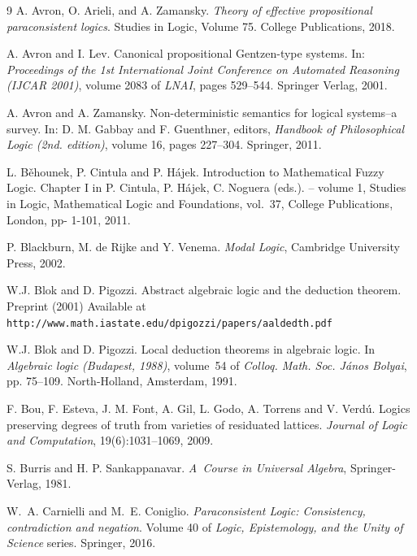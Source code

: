 \documentclass{article}
\theoremstyle{definition}
\begin{document}
\begin{thebibliography}{9}
A. Avron, O. Arieli,  and A. Zamansky. {\em Theory of effective propositional paraconsistent logics}.  Studies in Logic, Volume 75. College Publications, 2018.


A. Avron and I. Lev.
Canonical propositional {G}entzen-type systems.
In: {\em  Proceedings of the 1st {I}nternational {J}oint {C}onference on {A}utomated {R}easoning ({IJCAR} 2001)}, volume 2083 of {\em LNAI}, pages 529--544.
  Springer Verlag, 2001.


A. Avron and A. Zamansky. Non-deterministic semantics for logical
systems--a survey. In: D. M. Gabbay and F. Guenthner, editors, {\em Handbook of Philosophical Logic (2nd. edition)}, volume 16, pages 227--304. Springer, 2011.


  L. B\v{e}hounek, P. Cintula and P. H\'ajek. Introduction to Mathematical Fuzzy Logic. Chapter I in P. Cintula, P. H\'ajek, C. Noguera (eds.).
 -- volume 1,
\newblock Studies in Logic, Mathematical Logic and Foundations, vol.~37, College Publications, London, pp- 1-101, 2011. 


P. Blackburn, M. de Rijke and Y. Venema. {\em Modal Logic}, Cambridge University Press, 2002. 

W.J. Blok and D. Pigozzi. Abstract algebraic logic and the deduction theorem.
Preprint (2001) Available at\\ {\tt\small http://www.math.iastate.edu/dpigozzi/papers/aaldedth.pdf}

W.J. Blok and D. Pigozzi. Local deduction theorems in algebraic logic. In {\em Algebraic logic ({B}udapest, 1988)}, volume~54 of {\em Colloq. Math. Soc. J{\'{a}}nos Bolyai}, pp. 75--109. North-Holland,
  Amsterdam, 1991.

 F. Bou, F. Esteva, J. M. Font, A. Gil, L. Godo, A. Torrens and V. Verd\'{u}. Logics preserving degrees of truth from varieties of residuated lattices. \emph{Journal of Logic and Computation}, 19(6):1031--1069, 2009.

S. Burris and H. P.  Sankappanavar. {\em A~Course
in Universal Algebra}, Springer-Verlag, 1981.

 W.~A. Carnielli and M.~E. Coniglio. {\em Paraconsistent Logic: Consistency, contradiction and negation}. Volume 40 of {\em Logic, Epistemology, and the Unity of Science} series. Springer, 2016.


\end{thebibliography}
\end{document}

